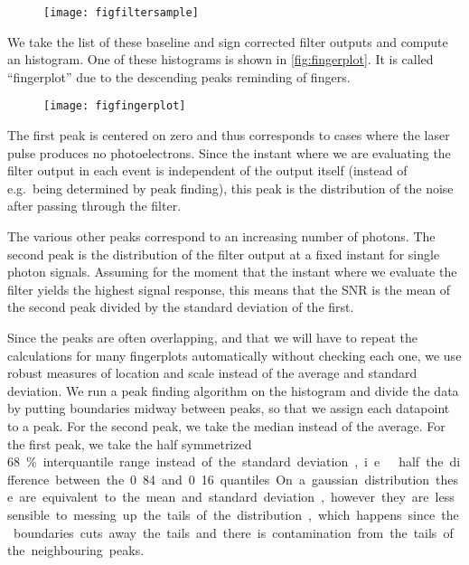 \begin{figure}
    \hspace{-0.25\textwidth}
    \texttt{[image: figfiltersample]}
    

\end{figure}

We take the list of these baseline and sign corrected filter outputs and
compute an histogram. One of these histograms is shown in
\autoref{fig:fingerplot}. It is called ``fingerplot'' due to the descending
peaks reminding of fingers.

\begin{figure}
    \hspace{0.00\textwidth}
    \texttt{[image: figfingerplot]}
    

\end{figure}

The first peak is centered on zero and thus corresponds to cases where the
laser pulse produces no photoelectrons. Since the instant where we are
evaluating the filter output in each event is independent of the output itself
(instead of e.g.\ being determined by peak finding), this peak is the
distribution of the noise after passing through the filter.

The various other peaks correspond to an increasing number of photons. The
second peak is the distribution of the filter output at a fixed instant for
single photon signals. Assuming for the moment that the instant where we
evaluate the filter yields the highest signal response, this means that the SNR
is the mean of the second peak divided by the standard deviation of the first.

Since the peaks are often overlapping, and that we will have to repeat the
calculations for many fingerplots automatically without checking each one, we
use robust measures of location and scale instead of the average and standard
deviation. We run a peak finding algorithm on the histogram and divide the data
by putting boundaries midway between peaks, so that we assign each datapoint to
a peak. For the second peak, we take the median instead of the average. For the
first peak, we take the half symmetrized \SI{68}\% interquantile range instead
of the standard deviation, i.e.\ half the difference between the 0.84 and 0.16
quantiles. On a gaussian distribution these are equivalent to the mean and
standard deviation, however they are less sensible to messing up the tails of
the distribution, which happens since the boundaries cuts away the tails and
there is contamination from the tails of the neighbouring peaks.

